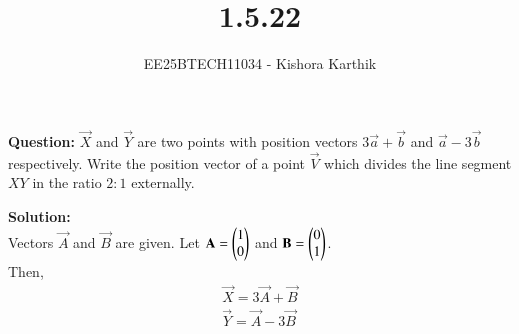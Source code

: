 \documentclass[journal]{IEEEtran}
\begin{document}

\vspace{3cm}

\title{1.5.22}
\author{EE25BTECH11034 - Kishora Karthik}
{\let\newpage\relax\maketitle}

\renewcommand{\thefigure}{\theenumi}
\renewcommand{\thetable}{\theenumi}
\setlength{\intextsep}{10pt} %
\textbf{Question:}
$\vec{X}$ and $\vec{Y}$ are two points with position vectors $3\vec{a} + \vec{b}$ and $\vec{a} - 3\vec{b}$ respectively. Write the position vector of a point $\vec{V}$ which divides the line segment $XY$ in the ratio $2:1$ externally.
\bigskip


\textbf{Solution:}\\
Vectors $\vec{A}$ and $\vec{B}$ are given.
Let $\mathbf{A}=\begin{pmatrix}1\\0\end{pmatrix}$ and $\mathbf{B}=\begin{pmatrix}0\\1\end{pmatrix}$.\\
Then,
\begin{align}
    \vec{X}=3\vec{A}+\vec{B}\\
    \vec{Y}=\vec{A}-3\vec{B}
\end{align}
\end{document}
